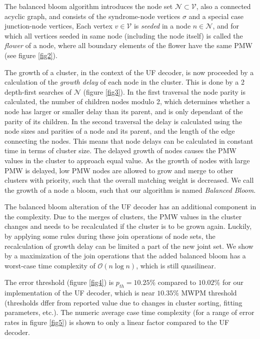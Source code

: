 \documentclass[11pt, a4paper, twoside, titlepage, usenames,dvipsnames]{report}
\begin{document}
The balanced bloom algorithm introduces the node set $\mathcal{N} \subset \mathcal{V}$, also a connected acyclic graph, and consists of the syndrome-node vertices $\sigma$ and a special case junction-node vertices, Each vertex $v \in \mathcal{V}$ is \emph{seeded} in a node $n\in \mathcal{N}$, and for which all vertices seeded in same node (including the node itself) is called the \emph{flower} of a node, where all boundary elements of the flower have the same PMW (see figure \ref{fig2}).

The growth of a cluster, in the context of the UF decoder, is now proceeded by a calculation of the \emph{growth delay} of each node in the cluster. This is done by a 2 depth-first searches of $\mathcal{N}$ (figure \ref{fig3}). In the first traversal the node parity is calculated, the number of children nodes modulo 2, which determines whether a node has larger or smaller delay than its parent, and is only dependant of the parity of its children. In the second traversal the delay is calculated using the node sizes and parities of a node and its parent, and the length of the edge connecting the nodes. This means that node delays can be calculated in constant time in terms of cluster size. The delayed growth of nodes causes the PMW values in the cluster to approach equal value. As the growth of nodes with large PMW is delayed, low PMW nodes are allowed to grow and merge to other clusters with priority, such that the overall matching weight is decreased. We call the growth of a node a bloom, such that our algorithm is named \emph{Balanced Bloom}.

The balanced bloom alteration of the UF decoder has an additional component in the complexity. Due to the merges of clusters, the PMW values in the cluster changes and needs to be recalculated if the cluster is to be grown again. Luckily, by applying some rules during these join operations of node sets, the recalculation of growth delay can be limited a part of the new joint set. We show by a maximization of the join operations that the added balanced bloom has a worst-case time complexity of $\mathcal{O}(n \log n)$, which is still quasilinear.

The error threshold (figure \ref{fig4}) is $p_{th} = 10.25\%$ compared to $10.02\%$ for our implementation of the UF decoder, which is near $10.35\%$ MWPM threshold (thresholds dffer from reported value due to changes in cluster sorting, fitting parameters, etc.). The numeric average case time complexity (for a range of error rates in figure \ref{fig5}) is shown to only a linear factor compared to the UF decoder.
\end{document}
